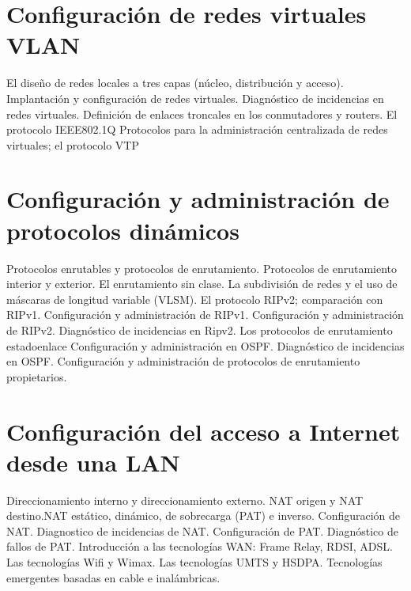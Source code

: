 \documentclass[letterpaper,10pt,spanish]{sphinxmanual}
\begin{document}
\chapter{Configuración de redes virtuales VLAN}
\label{\detokenize{t5_vlans/apuntes_t5:configuracion-de-redes-virtuales-vlan}}\label{\detokenize{t5_vlans/apuntes_t5::doc}}
\sphinxAtStartPar
El diseño de redes locales a tres capas (núcleo, distribución y acceso).
Implantación y configuración de redes virtuales.
Diagnóstico de incidencias en redes virtuales.
Definición de enlaces troncales en los conmutadores y routers.
El protocolo IEEE802.1Q
Protocolos para la administración centralizada de redes virtuales; el protocolo VTP


\chapter{Configuración y administración de protocolos dinámicos}
\label{\detokenize{t6_enrutamiento_dinamico/apuntes_t6:configuracion-y-administracion-de-protocolos-dinamicos}}\label{\detokenize{t6_enrutamiento_dinamico/apuntes_t6::doc}}
\sphinxAtStartPar
Protocolos enrutables y protocolos de enrutamiento.
Protocolos de enrutamiento interior y exterior.
El enrutamiento sin clase.
La subdivisión de redes y el uso de máscaras de longitud variable (VLSM).
El protocolo RIPv2; comparación con RIPv1.
Configuración y administración de RIPv1.
Configuración y administración de RIPv2.
Diagnóstico de incidencias en Ripv2.
Los protocolos de enrutamiento estado\sphinxhyphen{}enlace
Configuración y administración en OSPF.
Diagnóstico de incidencias en OSPF.
Configuración y administración de protocolos de enrutamiento propietarios.


\chapter{Configuración del acceso a Internet desde una LAN}
\label{\detokenize{t7_acceso_internet/apuntes_t7:configuracion-del-acceso-a-internet-desde-una-lan}}\label{\detokenize{t7_acceso_internet/apuntes_t7::doc}}
\sphinxAtStartPar
Direccionamiento interno y direccionamiento externo.
NAT origen y NAT destino.NAT estático, dinámico, de sobrecarga (PAT) e inverso.
Configuración de NAT.
Diagnostico de incidencias de NAT.
Configuración de PAT.
Diagnóstico de fallos de PAT.
Introducción a las tecnologías WAN: Frame Relay, RDSI, ADSL.
Las tecnologías Wifi y Wimax.
Las tecnologías UMTS y HSDPA.
Tecnologías emergentes basadas en cable e inalámbricas.
\end{document}
